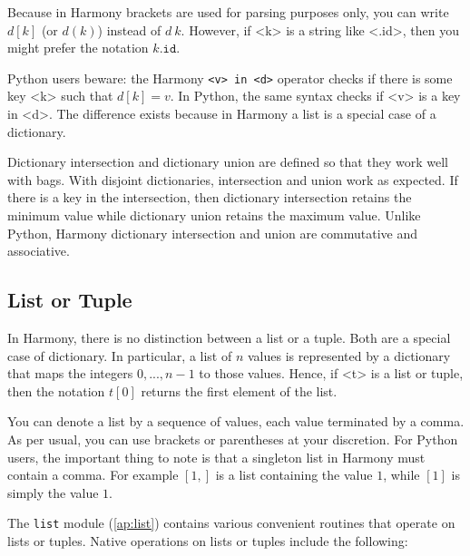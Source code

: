 \documentclass{report}
\begin{document}
Because in Harmony brackets are used for parsing purposes only,
you can write $d[k]$ (or $d(k)$) instead of $d~k$.
However, if <{k}> is a string like <{.id}>, then you might
prefer the notation $k\mathtt{.id}$.

Python users beware: the Harmony \texttt{<{v}> in <{d}>} operator checks
if there is some key <{k}> such that $d[k] = v$.  In Python, the same
syntax checks if <{v}> is a key in <{d}>.  The difference exists because
in Harmony a list is a special case of a dictionary.

Dictionary intersection and dictionary union are defined so that
they work well with bags.  With disjoint dictionaries, intersection
and union work as expected.  If there is a key in the intersection, then
dictionary intersection retains the minimum value while dictionary
union retains the maximum value.  Unlike Python, Harmony
dictionary intersection and union are commutative and associative.

\subsection*{List or Tuple}

In Harmony, there is no distinction between a list or a tuple.
Both are a special case of dictionary.  In particular, a list of
$n$ values is represented by a dictionary that maps the integers
$0, ..., n-1$ to those values.  Hence, if <{t}> is a list or tuple,
then the notation $t[0]$ returns the first element of the list.

You can denote a list by a sequence of values, each value terminated
by a comma.  As per usual, you can use brackets or parentheses
at your discretion.  For Python users, the important thing to note
is that a singleton list in Harmony must contain a comma.  For
example $[1,]$ is a list containing the value $1$, while $[1]$
is simply the value $1$.

The \texttt{list} module (\autoref{ap:list}) contains various
convenient routines that operate on lists or tuples.
Native operations on lists or tuples include the following:
\end{document}
